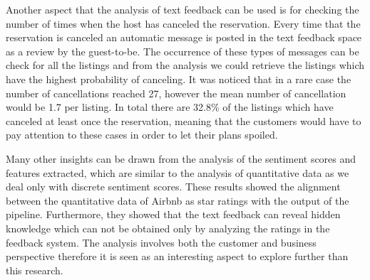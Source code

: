 Another aspect that the analysis of text feedback can be used is for checking the number of times when the host has canceled the reservation. Every time that the reservation is canceled an automatic message is posted in the text feedback space as a review by the guest-to-be. The occurrence of these types of messages can be check for all the listings and from the analysis we could retrieve the listings which have the highest probability of canceling. It was noticed that in a rare case the number of cancellations reached 27, however the mean number of cancellation would be 1.7 per listing. In total there are 32.8\% of the listings which have canceled at least once the reservation, meaning that the customers would have to pay attention to these cases in order to let their plans spoiled.

Many other insights can be drawn from the analysis of the sentiment scores and features extracted, which are similar to the analysis of quantitative data as we deal only with discrete sentiment scores. These results showed the alignment between the quantitative data of Airbnb as star ratings with the output of the pipeline. Furthermore, they showed that the text feedback can reveal hidden knowledge which can not be obtained only by analyzing the ratings in the feedback system. The analysis involves both the customer and business perspective therefore it is seen as an interesting aspect to explore further than this research.